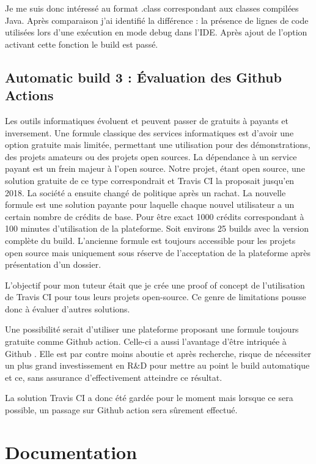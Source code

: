 \documentclass[french,a4paper,12pt]{report}
\begin{document}
Je me suis donc intéressé au format .class correspondant aux classes compilées Java. 
Après comparaison j’ai identifié la différence : la présence de lignes de code utilisées lors d'une exécution en mode debug dans l’IDE. Après ajout de l’option activant cette fonction le build est passé.

\subsection{Automatic build 3 : Évaluation des Github Actions}

Les outils informatiques évoluent et peuvent passer de gratuits à payants et inversement. Une formule classique des services informatiques est d’avoir une option gratuite mais limitée, permettant une utilisation pour des démonstrations, des projets amateurs ou des projets open sources. La dépendance à un service payant est un frein majeur à l’open source. Notre projet, étant open source, une solution gratuite de ce type correspondrait et Travis CI la proposait jusqu’en 2018. La société a ensuite changé de politique après un rachat. La nouvelle formule est une solution payante pour laquelle chaque nouvel utilisateur a un certain nombre de crédits de base. Pour être exact 1000 crédits correspondant à 100 minutes d’utilisation de la plateforme. Soit environs 25 builds avec la version complète du build. L'ancienne formule est toujours accessible pour les projets open source mais uniquement sous réserve de l'acceptation de la plateforme après présentation d'un dossier.

L’objectif pour mon tuteur était que je crée une proof of concept de l’utilisation de Travis CI pour tous leurs projets open-source. Ce genre de limitations pousse donc à évaluer d'autres solutions.

Une possibilité serait d’utiliser une plateforme proposant une formule toujours gratuite comme Github action. Celle-ci a aussi l’avantage d’être intriquée à Github . Elle est par contre moins aboutie et après recherche, risque de nécessiter un plus grand investissement en R\&D pour mettre au point le build automatique et ce, sans assurance d’effectivement atteindre ce résultat.

La solution Travis CI a donc été gardée pour le moment mais lorsque ce sera possible, un passage sur Github action sera sûrement effectué.


\section{Documentation}
\end{document}
